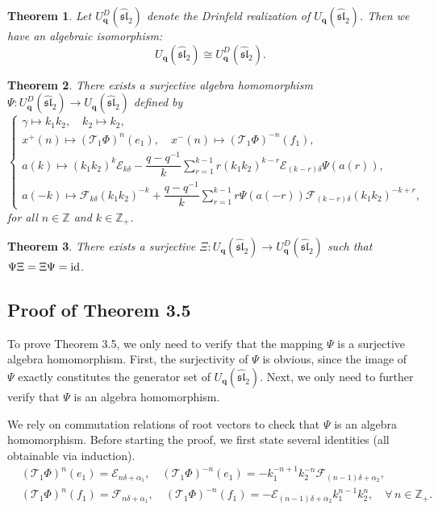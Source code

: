 \documentclass[12pt]{amsart}
\newtheorem{theorem}{Theorem}[section]
\numberwithin{equation}{section}
\numberwithin{equation}{section}
\begin{document}
\begin{theorem}  
Let \(U_{\textbf{q}}^{D}(\widehat{\mathfrak{sl}}_{2})\) denote the Drinfeld realization of \(U_{\textbf{q}}(\widehat{\mathfrak{sl}}_{2})\). Then we have an algebraic isomorphism:
\[U_{\textbf{q}}(\widehat{\mathfrak{sl}}_{2}) \cong U_{\textbf{q}}^{D}(\widehat{\mathfrak{sl}}_{2}).\]  
\end{theorem}
\begin{theorem} 
There exists a surjective algebra homomorphism \(\Psi: U_{\textbf{q}}^{D}(\widehat{\mathfrak{sl}}_{2}) \to U_{\textbf{q}}(\widehat{\mathfrak{sl}}_{2})\) defined by  
\[
\begin{cases}
\gamma \longmapsto k_{1}k_{2}, \quad k_{2} \longmapsto k_{2}, \\
x^{+}(n) \longmapsto (\mathcal{T}_{1}\Phi)^{n}(e_{1}), \quad x^{-}(n) \longmapsto (\mathcal{T}_{1}\Phi)^{-n}(f_{1}), \\
a(k) \longmapsto (k_{1}k_{2})^{k}\mathcal{E}_{k\delta} - \dfrac{q-q^{-1}}{k}\sum\limits_{r=1}^{k-1}r(k_{1}k_{2})^{k-r}\mathcal{E}_{(k-r)\delta}\Psi(a(r)), \\
a(-k) \longmapsto \mathcal{F}_{k\delta}(k_{1}k_{2})^{-k} + \dfrac{q-q^{-1}}{k}\sum\limits_{r=1}^{k-1}r\Psi(a(-r))\mathcal{F}_{(k-r)\delta}(k_{1}k_{2})^{-k+r},
\end{cases}
\]  
for all \(n \in \mathbb{Z}\) and \(k \in \mathbb{Z}_{+}\). \end{theorem}

\begin{theorem}
There exists a surjective \(\Xi: U_{\textbf{q}}(\widehat{\mathfrak{sl}}_{2}) \to U_{\textbf{q}}^{D}(\widehat{\mathfrak{sl}}_{2})\) such that \(\Psi\Xi=\Xi\Psi=\text{\rm id}\). 
\end{theorem}

\subsection{Proof of Theorem 3.5}
To prove Theorem 3.5, we only need to verify that the mapping \(\Psi\) is a surjective algebra homomorphism. First, the surjectivity of \(\Psi\)
is obvious, since the image of \(\Psi\) exactly constitutes the generator set of \(U_{\textbf{q}}(\widehat{\mathfrak{sl}}_{2})\). Next, we only need to further verify that \(\Psi\)
is an algebra homomorphism.

We rely on commutation relations of root vectors  to check that \(\Psi\)
is an algebra homomorphism.
Before starting the proof, we first state several identities (all obtainable via induction).
\begin{align*}
&(\mathcal{T}_{1}\Phi)^{n}(e_{1})=\mathcal{E}_{n\delta+\alpha_1},\quad (\mathcal{T}_{1}\Phi)^{-n}(e_{1})=-k^{-n+1}_1k^{-n}_2\mathcal{F}_{(n-1)\delta+\alpha_2},\\
&(\mathcal{T}_{1}\Phi)^{n}(f_{1})=\mathcal{F}_{n\delta+\alpha_1},\quad (\mathcal{T}_{1}\Phi)^{-n}(f_{1})=-\mathcal{E}_{(n-1)\delta+\alpha_2}k^{n-1}_1k^n_2, \quad \forall\, n\in\mathbb{Z}_{+}.
\end{align*}
\end{document}
